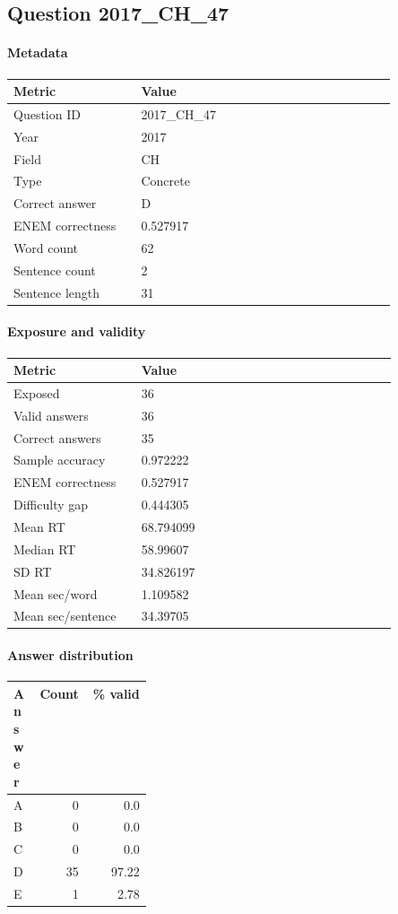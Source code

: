 \subsection*{Question 2017\_CH\_47}
\label{sec:q_2017_CH_47}
\paragraph{Metadata}
\begin{tabular}{p{0.30\linewidth}p{0.60\linewidth}}
\toprule
Metric & Value\\
\midrule
Question ID & 2017\_CH\_47\\
Year & 2017\\
Field & CH\\
Type & Concrete\\
Correct answer & D\\
ENEM correctness & 0.527917\\
Word count & 62\\
Sentence count & 2\\
Sentence length & 31\\
\bottomrule
\end{tabular}

\paragraph{Exposure and validity}
\begin{tabular}{p{0.30\linewidth}p{0.60\linewidth}}
\toprule
Metric & Value\\
\midrule
Exposed & 36\\
Valid answers & 36\\
Correct answers & 35\\
Sample accuracy & 0.972222\\
ENEM correctness & 0.527917\\
Difficulty gap & 0.444305\\
Mean RT & 68.794099\\
Median RT & 58.99607\\
SD RT & 34.826197\\
Mean sec/word & 1.109582\\
Mean sec/sentence & 34.39705\\
\bottomrule
\end{tabular}

\paragraph{Answer distribution}
\begin{tabular}{p{0.18\linewidth}rr}
\toprule
Answer & Count & \% valid\\
\midrule
A & 0 & 0.0\\
B & 0 & 0.0\\
C & 0 & 0.0\\
D & 35 & 97.22\\
E & 1 & 2.78\\
\bottomrule
\end{tabular}


